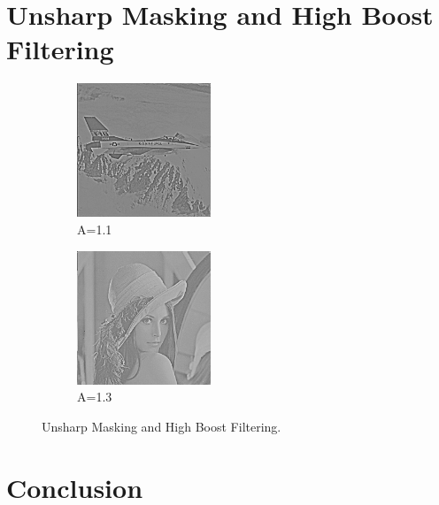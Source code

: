 \documentclass[letterpaper,10pt]{article}
\begin{document}
\section{Unsharp Masking and High Boost Filtering}
  \begin{figure}[hbtp]
    \centering
    \begin{subfigure}{4cm}
      \includegraphics[width=4cm]{images/unsharp_highboost_f16_1-1.png}
      \caption{A=1.1}
    \end{subfigure}
    \begin{subfigure}{4cm}
      \includegraphics[width=4cm]{images/unsharp_highboost_lenna_1-3.png}
      \caption{A=1.3}
    \end{subfigure}
    \caption{Unsharp Masking and High Boost Filtering.}
    \label{fig:unsharp}
  \end{figure}
\section{Conclusion}
\end{document}
